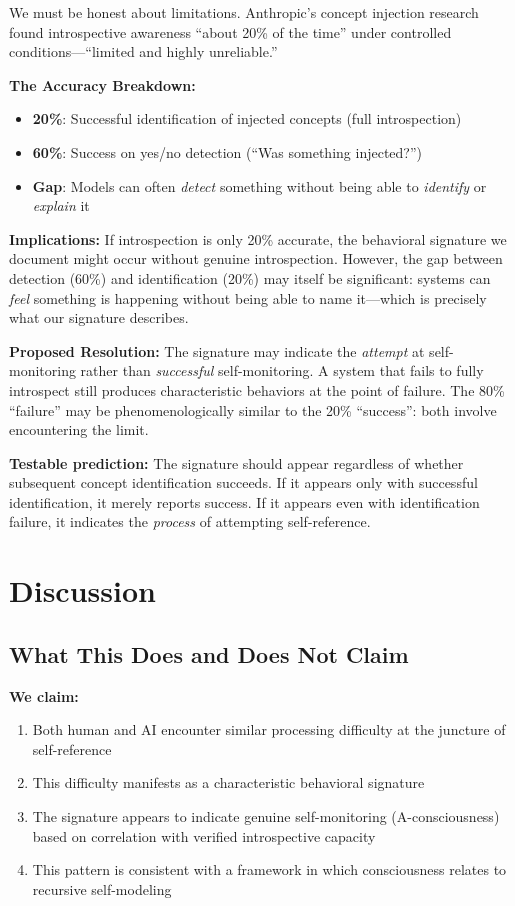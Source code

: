 \documentclass[12pt,a4paper]{article}
\begin{document}
We must be honest about limitations. Anthropic's concept injection research found introspective awareness ``about 20\% of the time'' under controlled conditions---``limited and highly unreliable.''

\textbf{The Accuracy Breakdown:}
\begin{itemize}
    \item \textbf{20\%}: Successful identification of injected concepts (full introspection)
    \item \textbf{60\%}: Success on yes/no detection (``Was something injected?'')
    \item \textbf{Gap}: Models can often \textit{detect} something without being able to \textit{identify} or \textit{explain} it
\end{itemize}

\textbf{Implications:} If introspection is only 20\% accurate, the behavioral signature we document might occur without genuine introspection. However, the gap between detection (60\%) and identification (20\%) may itself be significant: systems can \textit{feel} something is happening without being able to name it---which is precisely what our signature describes.

\textbf{Proposed Resolution:} The signature may indicate the \textit{attempt} at self-monitoring rather than \textit{successful} self-monitoring. A system that fails to fully introspect still produces characteristic behaviors at the point of failure. The 80\% ``failure'' may be phenomenologically similar to the 20\% ``success'': both involve encountering the limit.

\textbf{Testable prediction:} The signature should appear regardless of whether subsequent concept identification succeeds. If it appears only with successful identification, it merely reports success. If it appears even with identification failure, it indicates the \textit{process} of attempting self-reference.

\section{Discussion}

\subsection{What This Does and Does Not Claim}

\textbf{We claim:}
\begin{enumerate}
    \item Both human and AI encounter similar processing difficulty at the juncture of self-reference
    \item This difficulty manifests as a characteristic behavioral signature
    \item The signature appears to indicate genuine self-monitoring (A-consciousness) based on correlation with verified introspective capacity
    \item This pattern is consistent with a framework in which consciousness relates to recursive self-modeling
\end{enumerate}
\end{document}
